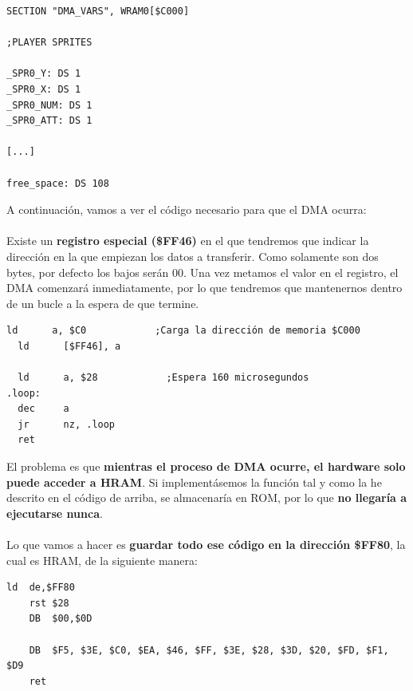 \begin{lstlisting}[caption={Reserva de Memoria para DMA}, label={code:dma_space}]
SECTION "DMA_VARS", WRAM0[$C000]

;PLAYER SPRITES

_SPR0_Y: DS 1
_SPR0_X: DS 1
_SPR0_NUM: DS 1
_SPR0_ATT: DS 1

[...]

free_space: DS 108

\end{lstlisting}
\clearpage
A continuación, vamos a ver el código necesario para que el DMA ocurra:
\\ \\
Existe un \textbf{registro especial (\$FF46)} en el que tendremos que indicar la dirección en la que empiezan los datos a transferir. Como solamente son dos bytes, por defecto los bajos serán 00. Una vez metamos el valor en el registro, el DMA comenzará inmediatamente, por lo que tendremos que mantenernos dentro de un bucle a la espera de que termine.

\begin{lstlisting}[caption={Inicio del proceso DMA}, label={code:dma_wait}]
  ld      a, $C0 			;Carga la dirección de memoria $C000
  ld      [$FF46], a

  ld      a, $28 			;Espera 160 microsegundos
.loop:
  dec     a
  jr      nz, .loop
  ret
\end{lstlisting}

El problema es que \textbf{mientras el proceso de DMA ocurre, el hardware solo puede acceder a HRAM}. Si implementásemos la función tal y como la he descrito en el código de arriba, se almacenaría en ROM, por lo que \textbf{no llegaría a ejecutarse nunca}.
\\ \\
Lo que vamos a hacer es \textbf{guardar todo ese código en la dirección \$FF80}, la cual es HRAM, de la siguiente manera:

\begin{lstlisting}[caption={Copiado de Proceso DMA}, label={code:dma_copy1}]
	ld  de,$FF80
	rst $28
	DB  $00,$0D

  	DB  $F5, $3E, $C0, $EA, $46, $FF, $3E, $28, $3D, $20, $FD, $F1, $D9
  	ret
\end{lstlisting}

